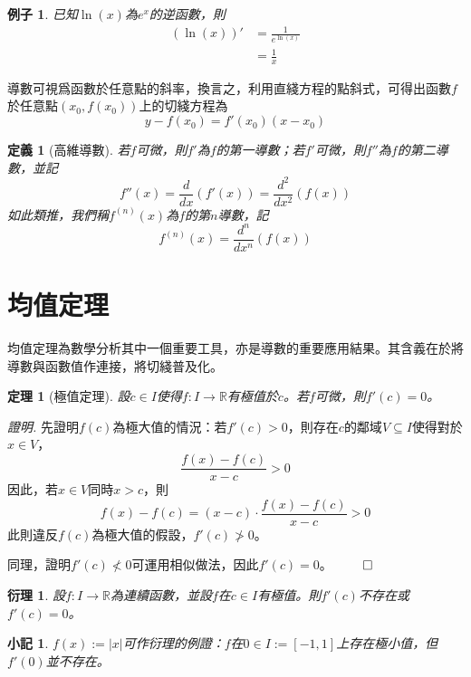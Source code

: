 \documentclass[12pt]{article}
\newtheorem{definition}{定義}
\newtheorem*{theorem}{定理}
\newtheorem*{corollary}{衍理}
\newtheorem*{remark}{小記}
\newtheorem*{example}{例子}
\renewenvironment*{proof}{\textit{證明.}}{\hfill$\qed$}
\begin{document}
    \begin{example}
        已知$\ln(x)$為$e^x$的逆函數，則\begin{align*}
            (\ln(x))'&=\frac{1}{e^{\ln(x)}}\\
            &=\frac{1}{x}
        \end{align*}
    \end{example}

    導數可視爲函數於任意點的斜率，換言之，利用直綫方程的點斜式，可得出函數$f$於任意點$(x_0,f(x_0))$上的切綫方程為$$y-f(x_0)=f'(x_0)(x-x_0)$$

    \begin{definition}[高維導數]
        若$f$可微，則$f'$為$f$的第一導數；若$f'$可微，則$f''$為$f$的第二導數，並記$$f''(x)=\dfrac{d}{dx}(f'(x))=\dfrac{d^2}{dx^2}(f(x))$$如此類推，我們稱$f^{(n)}(x)$為$f$的第$n$導數，記$$f^{(n)}(x)=\dfrac{d^n}{dx^n}(f(x))$$
    \end{definition}

    \section*{均值定理}

    均值定理為數學分析其中一個重要工具，亦是導數的重要應用結果。其含義在於將導數與函數值作連接，將切綫普及化。

    \begin{theorem}[極值定理]
        設$c\in I$使得$f:I\to \mathbb{R}$有極值於$c$。若$f$可微，則$f'(c)=0$。
    \end{theorem}

    \begin{proof}
        先證明$f(c)$為極大值的情況：若$f'(c)>0$，則存在$c$的鄰域$V\subseteq I$使得對於$x\in V$，$$\frac{f(x)-f(c)}{x-c}>0$$因此，若$x\in V$同時$x>c$，則$$f(x)-f(c)=(x-c)\cdot\frac{f(x)-f(c)}{x-c}>0$$此則違反$f(c)$為極大值的假設，$f'(c)\not > 0$。

        同理，證明$f'(c)\not < 0$可運用相似做法，因此$f'(c)=0$。
    \end{proof}

    \begin{corollary}
        設$f:I\to\mathbb{R}$為連續函數，並設$f$在$c\in I$有極值。則$f'(c)$不存在或$f'(c)=0$。
    \end{corollary}

    \begin{remark}
        $f(x):=|x|$可作衍理的例證：$f$在$0\in I:=[-1,1]$上存在極小值，但$f'(0)$並不存在。
    \end{remark}
\end{document}
